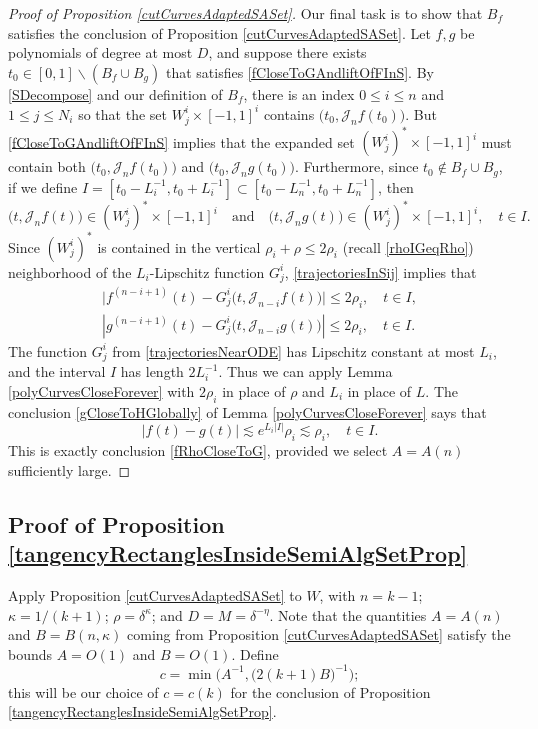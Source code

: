 \documentclass[letterpaper, reqno,11pt]{article}
\numberwithin{equation}{section}
\numberwithin{thm}{section}
\theoremstyle{remark}
\begin{document}
\begin{proof}[Proof of Proposition \ref{cutCurvesAdaptedSASet}]
Our final task is to show that $B_f$ satisfies the conclusion of Proposition \ref{cutCurvesAdaptedSASet}. Let $f,g$ be polynomials of degree at most $D$, and suppose there exists $t_0\in [0,1]\backslash(B_f \cup B_g)$ that satisfies \eqref{fCloseToGAndliftOfFInS}. By \eqref{SDecompose} and our definition of $B_f$, there is an index $0\leq i\leq n$ and $1\leq j\leq N_i$ so that the set $W^i_j\times[-1,1]^i$ contains $\big(t_0, \mathcal{J}_n f(t_0)\big)$. But \eqref{fCloseToGAndliftOfFInS} implies that the expanded set $(W^i_j)^*\times[-1,1]^i$ must contain both $\big(t_0, \mathcal{J}_nf(t_0)\big)$ and $\big(t_0, \mathcal{J}_ng(t_0)\big)$. Furthermore, since $t_0\not\in B_f\cup B_g$, if we define $I = [t_0 - L_i^{-1}, t_0+L_i^{-1}]\subset  [t_0 - L_n^{-1}, t_0+L_n^{-1}]$, then 
\begin{equation}\label{trajectoriesInSij}
\big(t, \mathcal{J}_nf(t)\big)\in (W^i_j)^*\times[-1,1]^i\quad\textrm{and}\quad \big(t, \mathcal{J}_ng(t)\big)\in (W^i_j)^*\times[-1,1]^i, \quad t\in I.
\end{equation}
%
Since $(W^i_j)^*$ is contained in the vertical $\rho_i+\rho\leq 2\rho_i$ (recall \eqref{rhoIGeqRho}) neighborhood of the $L_i$-Lipschitz function $G^i_j$, \eqref{trajectoriesInSij} implies that
%
\begin{equation}\label{trajectoriesNearODE}
\begin{split}
\big|f^{(n-i+1)}(t) - G^i_j\big(t, \mathcal{J}_{n-i}f(t)\big)\big|\leq 2\rho_i,\quad t\in I,\\
|g^{(n-i+1)}(t) - G^i_j\big(t, \mathcal{J}_{n-i}g(t)\big)|\leq 2\rho_i,\quad t\in I.
\end{split}
\end{equation}
%
The function $G^i_j$ from \eqref{trajectoriesNearODE} has Lipschitz constant at most $L_i$, and the interval $I$ has length $2L_i^{-1}$. Thus we can apply Lemma \ref{polyCurvesCloseForever} with $2\rho_i$ in place of $\rho$ and $L_i$ in place of $L$. The conclusion \eqref{gCloseToHGlobally} of Lemma \ref{polyCurvesCloseForever} says that
\[
|f(t)-g(t)|\lesssim e^{L_i|I|}\rho_i\lesssim \rho_i,\quad t\in I.
\]
This is exactly conclusion \eqref{fRhoCloseToG}, provided we select $A = A(n)$ sufficiently large.  
\end{proof}


\subsection{Proof of Proposition \ref{tangencyRectanglesInsideSemiAlgSetProp}}
Apply Proposition \ref{cutCurvesAdaptedSASet} to $W$, with $n = k-1$; $\kappa=1/(k+1)$; $\rho=\delta^{\kappa}$; and $D=M=\delta^{-\eta}$. Note that the quantities $A=A(n)$ and $B=B(n,\kappa)$ coming from Proposition \ref{cutCurvesAdaptedSASet} satisfy the bounds $A = O(1)$ and $B=O(1)$. Define
\begin{equation}\label{defnCPropTangencyRectanglesInsideSemiAlgSetProp}
c = \min\big(A^{-1}, \big(2(k+1)B\big)^{-1}\big);
\end{equation}
this will be our choice of $c = c(k)$ for the conclusion of Proposition \ref{tangencyRectanglesInsideSemiAlgSetProp}.
\end{document}
